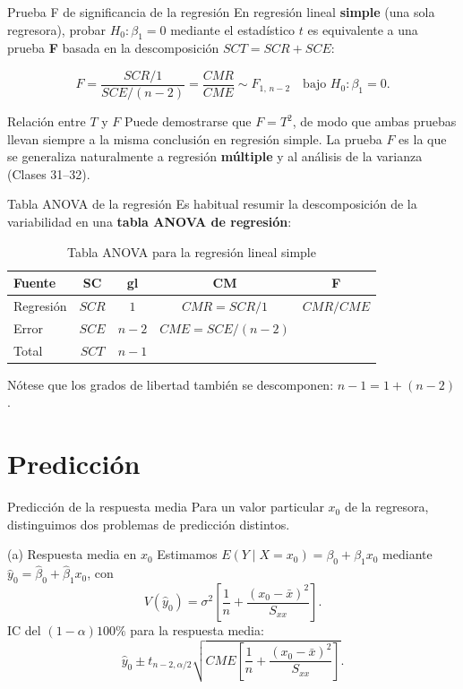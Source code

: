 \documentclass[aspectratio=169,11pt]{beamer}
\begin{document}
\begin{frame}{Prueba F de significancia de la regresión}
En regresión lineal \textbf{simple} (una sola regresora), probar $H_0:\beta_1=0$ mediante el estadístico $t$ es equivalente a una prueba \textbf{F} basada en la descomposición $SCT=SCR+SCE$:

\[
F = \frac{SCR/1}{SCE/(n-2)} = \frac{CMR}{CME} \sim F_{1,\,n-2} \quad \text{bajo } H_0:\beta_1=0.
\]

\begin{block}{Relación entre $T$ y $F$}
Puede demostrarse que $F = T^2$, de modo que ambas pruebas llevan siempre a la misma conclusión en regresión simple. La prueba $F$ es la que se generaliza naturalmente a regresión \textbf{múltiple} y al análisis de la varianza (Clases 31--32).
\end{block}
\end{frame}

\begin{frame}{Tabla ANOVA de la regresión}
Es habitual resumir la descomposición de la variabilidad en una \textbf{tabla ANOVA de regresión}:

\begin{table}[htbp]
\centering
\begin{tabular}{lcccc}
\toprule
Fuente & SC & gl & CM & F \\
\midrule
Regresión & $SCR$ & $1$ & $CMR = SCR/1$ & $CMR/CME$ \\
Error & $SCE$ & $n-2$ & $CME = SCE/(n-2)$ & \\
\midrule
Total & $SCT$ & $n-1$ & & \\
\bottomrule
\end{tabular}
\caption{Tabla ANOVA para la regresión lineal simple}
\end{table}

Nótese que los grados de libertad también se descomponen: $n-1 = 1 + (n-2)$.
\end{frame}

\section{Predicción}

\begin{frame}{Predicción de la respuesta media}
Para un valor particular $x_0$ de la regresora, distinguimos dos problemas de predicción distintos.

\begin{block}{(a) Respuesta media en $x_0$}
Estimamos $E(Y\mid X=x_0)=\beta_0+\beta_1 x_0$ mediante $\hat y_0 = \hat\beta_0+\hat\beta_1 x_0$, con
\[
V(\hat y_0) = \sigma^2\left[\frac{1}{n}+\frac{(x_0-\bar x)^2}{S_{xx}}\right].
\]
IC del $(1-\alpha)100\%$ para la respuesta media:
\[
\hat y_0 \pm t_{n-2,\alpha/2}\sqrt{CME\left[\frac{1}{n}+\frac{(x_0-\bar x)^2}{S_{xx}}\right]}.
\]
\end{block}
\end{frame}
\end{document}
